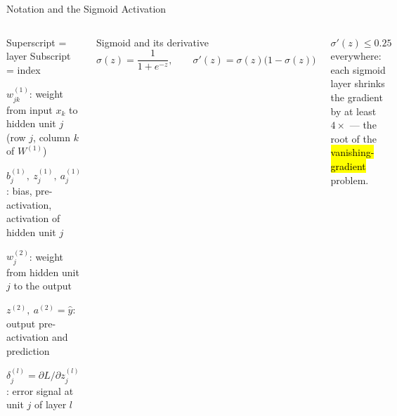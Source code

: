 \documentclass[aspectratio=169,10pt]{beamer}
\begin{document}
\begin{frame}{Notation and the Sigmoid Activation}
\begin{columns}[T]
\begin{cbox}{Superscript = layer \quad Subscript = index}
\begin{tl}
\item $w^{(1)}_{jk}$: weight from input $x_k$ to hidden unit $j$ (row $j$, column $k$ of $W^{(1)}$)
\item $b^{(1)}_j,\ z^{(1)}_j,\ a^{(1)}_j$: bias, pre-activation, activation of hidden unit $j$
\item $w^{(2)}_j$: weight from hidden unit $j$ to the output
\item $z^{(2)},\ a^{(2)}=\hat y$: output pre-activation and prediction
\item $\delta^{(l)}_j=\partial L/\partial z^{(l)}_j$: error signal at unit $j$ of layer $l$
\end{tl}
\end{cbox}
\begin{fbx}{Sigmoid and its derivative}
$\sigma(z)=\dfrac{1}{1+e^{-z}},\qquad \sigma'(z)=\sigma(z)\bigl(1-\sigma(z)\bigr)$
\end{fbx}
\begin{ibox}\scriptsize $\sigma'(z)\le 0.25$ everywhere: each sigmoid layer shrinks the gradient by at least $4\times$ --- the root of the \hl{vanishing-gradient} problem.\end{ibox}
\end{columns}
\end{frame}
\end{document}
